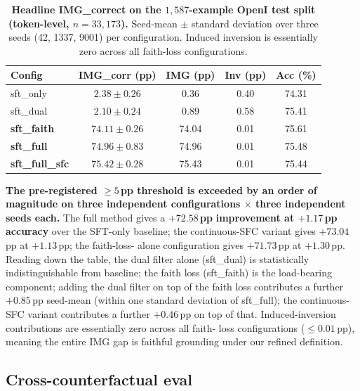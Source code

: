 \documentclass{article}
\begin{document}
\begin{table}[t]
\centering
\small
\caption{\textbf{Headline IMG\_correct on the $1{,}587$-example OpenI test
split (token-level, $n=33{,}173$).} Seed-mean $\pm$ standard deviation
over three seeds (42, 1337, 9001) per configuration. Induced inversion is
essentially zero across all faith-loss configurations.}
\label{tab:headline}
\setlength{\tabcolsep}{2.6pt}
\begin{tabular}{lcccc}
\toprule
\textbf{Config} & \textbf{IMG\_corr (pp)} & \textbf{IMG (pp)} & \textbf{Inv (pp)} & \textbf{Acc (\%)}\\
\midrule
sft\_only         & $2.38\pm0.26$  & 0.36  & 0.40 & 74.31 \\
sft\_dual         & $2.10\pm0.24$  & 0.89  & 0.58 & 75.41 \\
\textbf{sft\_faith}    & $\mathbf{74.11\pm0.26}$ & 74.04 & 0.01 & 75.61 \\
\textbf{sft\_full}     & $\mathbf{74.96\pm0.83}$ & 74.96 & 0.01 & 75.48 \\
\textbf{sft\_full\_sfc}& $\mathbf{75.42\pm0.28}$ & 75.43 & 0.01 & 75.44 \\
\bottomrule
\end{tabular}
\end{table}

\textbf{The pre-registered $\geq 5$\,pp threshold is exceeded by an order
of magnitude on three independent configurations $\times$ three independent
seeds each.} The full method gives a $\mathbf{+72.58}$\,\textbf{pp}
\textbf{improvement at $+1.17$\,pp accuracy} over the SFT-only baseline; the
continuous-SFC variant gives $+73.04$\,pp at $+1.13$\,pp; the faith-loss-
alone configuration gives $+71.73$\,pp at $+1.30$\,pp. Reading down the
table, the dual filter alone (sft\_dual) is statistically indistinguishable
from baseline; the faith loss (sft\_faith) is the load-bearing component;
adding the dual filter on top of the faith loss contributes a further
$+0.85$\,pp seed-mean (within one standard deviation of sft\_full); the
continuous-SFC variant contributes a further $+0.46$\,pp on top of that.
Induced-inversion contributions are essentially zero across all faith-
loss configurations ($\le 0.01$\,pp), meaning the entire IMG gap is
faithful grounding under our refined definition.

\subsection{Cross-counterfactual eval}
\label{sec:cross-cf}
\end{document}
